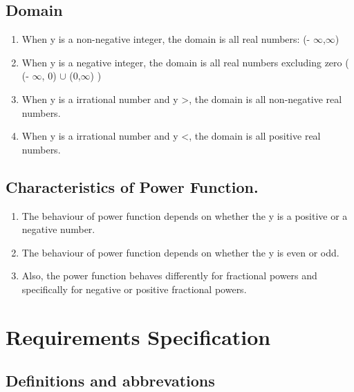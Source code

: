\documentclass[a4paper,12pt]{article}
\begin{document}
\subsection{Domain}
\begin{enumerate}
	\item When y is a non-negative integer, the domain is all real numbers:  (- $\infty$,$\infty$)
	
	\item When y is a negative integer, the domain is all real numbers excluding zero ( (- $\infty$, 0) $\cup$ (0,$\infty$) )
	
	\item When y is a irrational number and y \textgreater {}, the domain is all non-negative real numbers.
	
	\item When y is a irrational number and y \textless {}, the domain is all positive real numbers. 
\end{enumerate}


\subsection{Characteristics of Power Function.}
\begin{enumerate}
	\item The behaviour of power function depends on whether the y is a positive or a negative number.
	\item The behaviour of power function depends on whether the y is even or odd.
	\item Also, the power function behaves differently for fractional powers and specifically for negative or positive fractional powers.
\end{enumerate}




\section{Requirements Specification}
\subsection{Definitions and abbrevations}
\end{document}
